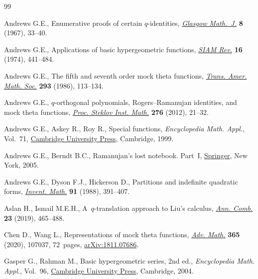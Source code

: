 \documentclass[pdftex]{sigma}
\numberwithin{equation}{section}
\begin{document}
\begin{thebibliography}{99}
\footnotesize\itemsep=0pt

Andrews G.E., Enumerative proofs of certain {$q$}-identities, \href{https://doi.org/10.1017/S0017089500000057}{\textit{Glasgow
 Math.~J.}} \textbf{8} (1967), 33--40.

Andrews G.E., Applications of basic hypergeometric functions, \href{https://doi.org/10.1137/1016081}{\textit{SIAM
 Rev.}} \textbf{16} (1974), 441--484.

Andrews G.E., The fifth and seventh order mock theta functions, \href{https://doi.org/10.2307/2000275}{\textit{Trans.
 Amer. Math. Soc.}} \textbf{293} (1986), 113--134.

Andrews G.E., {$q$}-orthogonal polynomials, {R}ogers--{R}amanujan identities,
 and mock theta functions, \href{https://doi.org/10.1134/S0081543812010038}{\textit{Proc. Steklov Inst. Math.}} \textbf{276}
 (2012), 21--32.

Andrews G.E., Askey R., Roy R., Special functions, \textit{Encyclopedia Math.
 Appl.}, Vol.~71, \href{https://doi.org/10.1017/CBO9781107325937}{Cambridge University Press}, Cambridge, 1999.

Andrews G.E., Berndt B.C., Ramanujan's lost notebook. {P}art~{I}, \href{https://doi.org/10.1007/0-387-28124-X}{Springer}, New
 York, 2005.

Andrews G.E., Dyson F.J., Hickerson D., Partitions and indefinite quadratic
 forms, \href{https://doi.org/10.1007/BF01388778}{\textit{Invent. Math.}} \textbf{91} (1988), 391--407.

Aslan H., Ismail M.E.H., A~{$q$}-translation approach to {L}iu's calculus,
 \href{https://doi.org/10.1007/s00026-019-00450-x}{\textit{Ann. Comb.}} \textbf{23} (2019), 465--488.

Chen D., Wang L., Representations of mock theta functions, \href{https://doi.org/10.1016/j.aim.2020.107037}{\textit{Adv. Math.}}
 \textbf{365} (2020), 107037, 72~pages, \href{https://arxiv.org/abs/1811.07686}{arXiv:1811.07686}.

Gasper G., Rahman M., Basic hypergeometric series, 2nd ed., \textit{Encyclopedia Math.
 Appl.}, Vol.~96, \href{https://doi.org/10.1017/CBO9780511526251}{Cambridge University Press}, Cambridge, 2004.


\end{thebibliography}
\end{document}

